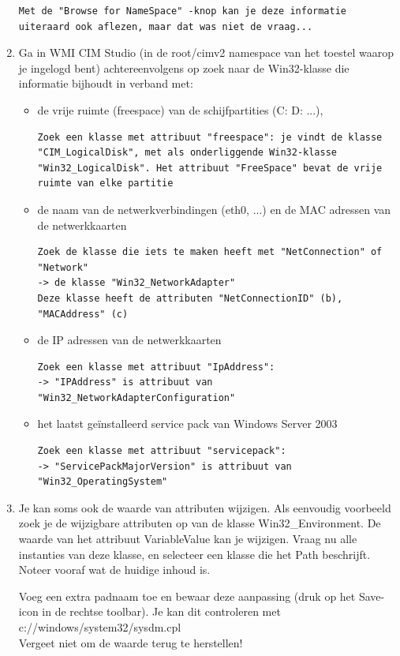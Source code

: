 \documentclass[11pt,a4paper]{report}
\begin{document}
\begin{enumerate}[resume]
\begin{lstlisting}
Met de "Browse for NameSpace" -knop kan je deze informatie uiteraard ook aflezen, maar dat was niet de vraag...
\end{lstlisting}
	\newpage
	\item Ga in WMI CIM Studio (in de root/cimv2 namespace van het toestel waarop je ingelogd bent) achtereenvolgens op zoek naar de Win32-klasse die informatie bijhoudt in verband met:
	\begin{itemize}
		\item de vrije ruimte (freespace) van de schijfpartities (C: D: ...),
\begin{lstlisting}
Zoek een klasse met attribuut "freespace": je vindt de klasse "CIM_LogicalDisk", met als onderliggende Win32-klasse "Win32_LogicalDisk". Het attribuut "FreeSpace" bevat de vrije ruimte van elke partitie
\end{lstlisting}
		\item de naam van de netwerkverbindingen (eth0, ...) en de MAC adressen van de netwerkkaarten
\begin{lstlisting}
Zoek de klasse die iets te maken heeft met "NetConnection" of "Network" 
-> de klasse "Win32_NetworkAdapter"
Deze klasse heeft de attributen "NetConnectionID" (b), "MACAddress" (c) 
\end{lstlisting}
		\item de IP adressen van de netwerkkaarten
\begin{lstlisting}
Zoek een klasse met attribuut "IpAddress": 
-> "IPAddress" is attribuut van "Win32_NetworkAdapterConfiguration"
\end{lstlisting}
		\item het laatst geïnstalleerd service pack van Windows Server 2003
\begin{lstlisting}
Zoek een klasse met attribuut "servicepack": 
-> "ServicePackMajorVersion" is attribuut van "Win32_OperatingSystem"
\end{lstlisting}
	\end{itemize}
	\item Je kan soms ook de waarde van attributen wijzigen. Als eenvoudig voorbeeld zoek je de wijzigbare attributen op van de klasse Win32\_Environment. De waarde van het attribuut VariableValue kan je wijzigen. Vraag nu alle instanties van deze klasse, en selecteer een klasse die het Path beschrijft.
	Noteer vooraf wat de huidige inhoud is.
	\par Voeg een extra padnaam toe en bewaar deze aanpassing (druk op het Save-icon in de rechtse toolbar). Je kan dit controleren met c://windows/system32/sysdm.cpl\\
	Vergeet niet om de waarde terug te herstellen!
\end{enumerate}
\end{document}
